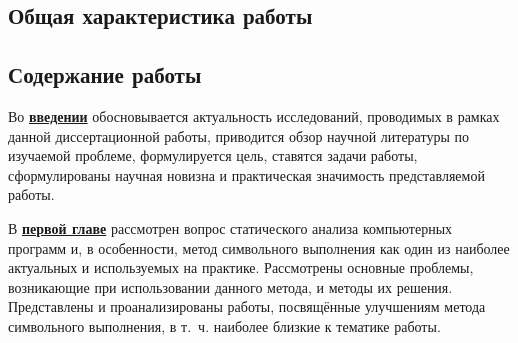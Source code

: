 \subsection*{Общая характеристика работы}

\newcommand{\actuality}{\underline{\textbf{Актуальность темы.}}}
\newcommand{\aim}{\underline{\textbf{Целью}}}
\newcommand{\tasks}{\underline{\textbf{задачи}}}
\newcommand{\defpositions}{\underline{\textbf{Основные положения, выносимые на~защиту:}}}
\newcommand{\novelty}{\underline{\textbf{Научная новизна:}}}
\newcommand{\influence}{\underline{\textbf{Практическая значимость}}}
\newcommand{\reliability}{\underline{\textbf{Достоверность}}}
\newcommand{\probation}{\underline{\textbf{Апробация работы.}}}
\newcommand{\contribution}{\underline{\textbf{Личный вклад.}}}
\newcommand{\publications}{\underline{\textbf{Публикации.}}}




\subsection*{Содержание работы}
Во \underline{\textbf{введении}} обосновывается актуальность исследований, проводимых в рамках данной диссертационной работы, приводится обзор научной литературы по изучаемой проблеме, формулируется цель, ставятся задачи работы, сформулированы научная новизна и практическая значимость представляемой работы.

В \underline{\textbf{первой главе}} рассмотрен вопрос статического анализа компьютерных программ и, в особенности, метод символьного выполнения как один из наиболее актуальных и используемых на практике. Рассмотрены основные проблемы, возникающие при использовании данного метода, и методы их решения. Представлены и проанализированы работы, посвящённые улучшениям метода символьного выполнения, в т.~ч. наиболее близкие к тематике работы.


